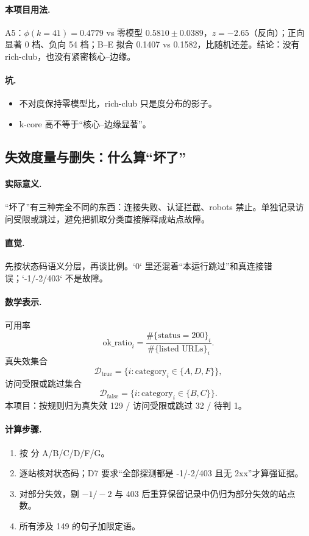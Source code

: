 \paragraph{本项目用法.}
\unit{A5}：\(\phi(k=41)=0.4779\) vs 零模型 \(0.5810\pm0.0389\)，\(z=-2.65\)（反向）；正向显著 0 档、负向 54 档；B--E 拟合 0.1407 vs 0.1582，比随机还差。结论：没有 rich-club，也没有紧密核心--边缘。

\paragraph{坑.}
\begin{itemize}
  \item 不对度保持零模型比，rich-club 只是度分布的影子。
  \item k-core 高不等于“核心--边缘显著”。
\end{itemize}

\subsection{失效度量与删失：什么算“坏了”}

\paragraph{实际意义.}
“坏了”有三种完全不同的东西：连接失败、认证拦截、robots 禁止。单独记录访问受限或跳过，避免把抓取分类直接解释成站点故障。

\paragraph{直觉.}
先按状态码语义分层，再谈比例。`0` 里还混着“本运行跳过”和真连接错误；`-1/-2/403` 不是故障。

\paragraph{数学表示.}
可用率
\[
\mathrm{ok\_ratio}_i=\frac{\#\{\text{status}=200\}_i}{\#\{\text{listed URLs}\}_i}.
\]
真失效集合
\[
\mathcal{D}_{\mathrm{true}}=\{i:\text{category}_i\in\{A,D,F\}\},
\]
访问受限或跳过集合
\[
\mathcal{D}_{\mathrm{false}}=\{i:\text{category}_i\in\{B,C\}\}.
\]
本项目：按规则归为真失效 129 / 访问受限或跳过 32 / 待判 1。

\paragraph{计算步骤.}
\begin{enumerate}
  \item 按  分 A/B/C/D/F/G。
  \item 逐站核对状态码；D7 要求“全部探测都是 -1/-2/403 且无 2xx”才算强证据。
  \item 对部分失效，剔 \(-1/-2\) 与 403 后重算保留记录中仍归为部分失效的站点数。
  \item 所有涉及 149 的句子加限定语。
\end{enumerate}

